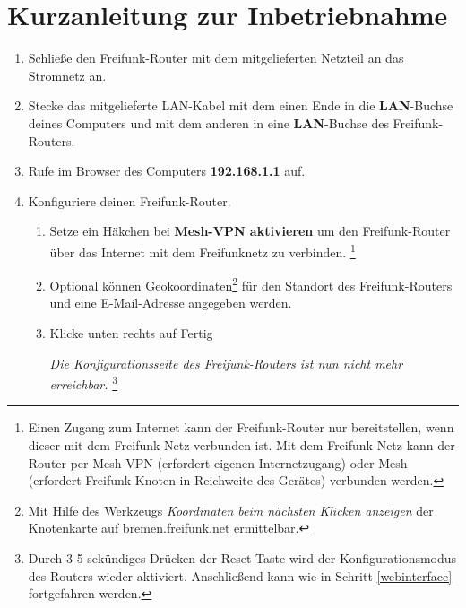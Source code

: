 \documentclass{article}
\begin{document}
\section*{Kurzanleitung zur Inbetriebnahme}

\begin{enumerate}
\item Schließe den Freifunk-Router mit dem mitgelieferten Netzteil an das Stromnetz an.

%

\item Stecke das mitgelieferte LAN-Kabel mit dem einen Ende in die \textbf{LAN}-Buchse deines Computers und mit dem anderen in eine \textbf{LAN}-Buchse des Freifunk-Routers.

\item Rufe im Browser des Computers \textbf{192.168.1.1} auf. \label{webinterface}

\item Konfiguriere deinen Freifunk-Router. 
\begin{enumerate}

%
  \item Setze ein Häkchen bei \glqq{}\textbf{Mesh-VPN aktivieren}\grqq{} um den Freifunk-Router über das Internet mit dem Freifunknetz zu verbinden. \label{vpn-mesh-aktivieren} \footnote{Einen Zugang zum Internet kann der Freifunk-Router nur bereitstellen, wenn dieser mit dem Freifunk-Netz verbunden ist. Mit dem Freifunk-Netz kann der Router per Mesh-VPN (erfordert eigenen Internetzugang) oder Mesh (erfordert Freifunk-Knoten in Reichweite des Gerätes) verbunden werden.}
  
  \item Optional können Geokoordinaten\footnote{Mit Hilfe des Werkzeugs \textit{Koordinaten beim nächsten Klicken anzeigen} der Knotenkarte auf bremen.freifunk.net ermittelbar.} für den Standort des Freifunk-Routers und eine E-Mail-Adresse angegeben werden.

  \item Klicke unten rechts auf \glqq{}Fertig\grqq{}  \label{fertig}

  \textit{Die Konfigurationsseite des Freifunk-Routers ist nun nicht mehr erreichbar.} \footnote{Durch 3-5 sekündiges Drücken der Reset-Taste wird der Konfigurationsmodus des Routers wieder aktiviert. Anschließend kann wie in Schritt \ref{webinterface} fortgefahren werden.}
\end{enumerate}


\end{enumerate}
\end{document}
